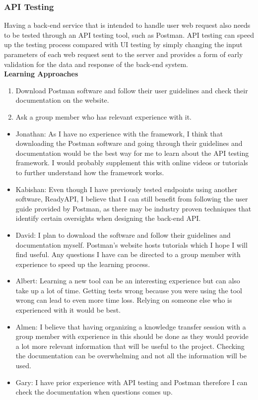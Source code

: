 \documentclass[12pt, titlepage]{article}
\begin{document}
\subsubsection{API Testing}
Having a back-end service that is intended to handle user web request also needs
to be tested through an API testing tool, such as Postman. API testing can speed
up the testing process compared with UI testing by simply changing the input
parameters of each web request sent to the server and provides a form of early
validation for the data and response of the back-end system.\\

\noindent \textbf{Learning Approaches}
\begin{enumerate}
    \item Download Postman software and follow their user guidelines and check
    their documentation on the website.
    \item Ask a group member who has relevant experience with it.
\end{enumerate}

\begin{itemize}
    \item Jonathan: As I have no experience with the framework, I think that
    downloading the Postman software and going through their guidelines and
    documentation would be the best way for me to learn about the API testing
    framework. I would probably supplement this with online videos or tutorials
    to further understand how the framework works.
    \item Kabishan: Even though I have previously tested endpoints using another
    software, ReadyAPI, I believe that I can still benefit from following the
    user guide provided by Postman, as there may be industry proven techniques
    that identify certain oversights when designing the back-end API. 
    \item David: I plan to download the software and follow their guidelines and
    documentation myself. Postman's website hosts tutorials which I hope I will
    find useful. Any questions I have can be directed to a group member with
    experience to speed up the learning process.
    \item Albert: Learning a new tool can be an interesting experience but can
    also take up a lot of time. Getting tests wrong because you were using the
    tool wrong can lead to even more time loss. Relying on someone else who is
    experienced with it would be best.
    \item Almen: I believe that having organizing a knowledge transfer session
    with a group member with experience in this should be done as they would
    provide a lot more relevant information that will be useful to the project.
    Checking the documentation can be overwhelming and not all the information
    will be used.
    \item Gary: I have prior experience with API testing and Postman therefore I
    can check the documentation when questions comes up.
\end{itemize}
\end{document}
